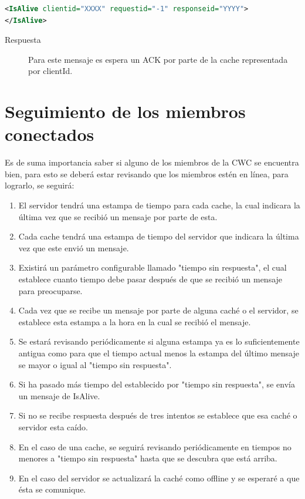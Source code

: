 \begin{lstlisting}[language=XML,caption=Mensaje de IsAlive]
<IsAlive clientid="XXXX" requestid="-1" responseid="YYYY"> 
</IsAlive>
\end{lstlisting}

\begin{description}
\item[Respuesta] Para este mensaje es espera un ACK por parte de la cache representada por clientId.
\end{description}

\section{Seguimiento de los miembros conectados}

Es de suma importancia saber si alguno de los miembros de la CWC se encuentra bien, para esto se deberá estar revisando que los miembros estén en línea, para lograrlo, se seguirá:

\begin{enumerate}
\item El servidor tendrá una estampa de tiempo para cada cache, la cual indicara la última vez que se recibió un mensaje por parte de esta.
\item Cada cache tendrá una estampa de tiempo del servidor que indicara la última vez que este envió un mensaje.
\item Existirá un parámetro configurable llamado "tiempo sin respuesta", el cual establece cuanto tiempo debe pasar después de que se recibió un mensaje para preocuparse.
\item Cada vez que se recibe un mensaje por parte de alguna caché o el servidor, se establece esta estampa a la hora en la cual se recibió el mensaje.
\item Se estará revisando periódicamente si alguna estampa ya es lo suficientemente antigua como para que el tiempo actual menos la estampa del último mensaje se mayor o igual al "tiempo sin respuesta".
\item Si ha pasado más tiempo del establecido por "tiempo sin respuesta", se envía un mensaje de IsAlive.
\item Si no se recibe respuesta después de tres intentos se establece que esa caché o servidor esta caído.
\item En el caso de una cache, se seguirá revisando periódicamente en tiempos no menores a "tiempo sin respuesta" hasta que se descubra que está arriba.
\item En el caso del servidor se actualizará la caché como offline y se esperaré a que ésta se comunique.
\end{enumerate}

